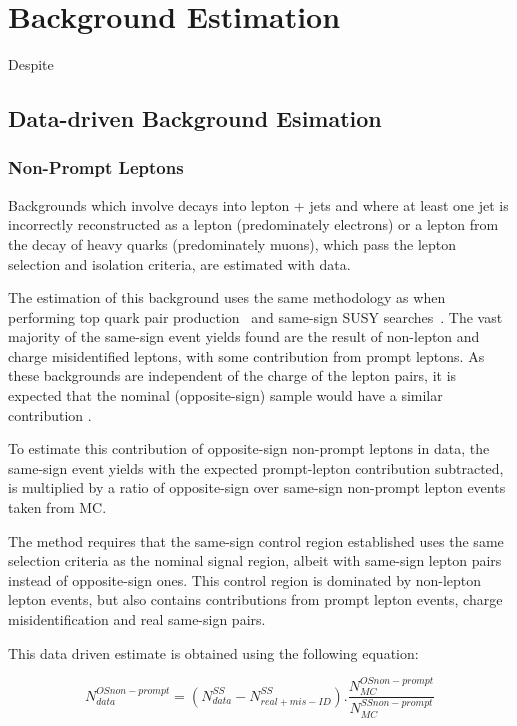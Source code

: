 \chapter{Background Estimation}\label{chapter:bkg}
Despite 

\section{Data-driven Background Esimation}\label{sec:dataDrivenBackground}

\subsection{Non-Prompt Leptons}\label{sec:NPLs}
Backgrounds which involve decays into lepton + jets and where at least one jet is incorrectly reconstructed as a lepton (predominately electrons) or a lepton from the decay of heavy quarks (predominately muons), which pass the lepton selection and isolation criteria, are estimated with data.

The estimation of this background uses the same methodology as when performing top quark pair production~\cite{CMS:2016syx} and same-sign SUSY searches~\cite{CMS:2015vqc}.
The vast majority of the same-sign event yields found are the result of non-lepton and charge misidentified leptons, with some contribution from prompt leptons.
As these backgrounds are independent of the charge of the lepton pairs, it is expected that the nominal (opposite-sign) sample would have a similar contribution \cite{CMS:2015vqc}.

To estimate this contribution of opposite-sign non-prompt leptons in data, the same-sign event yields with the expected prompt-lepton contribution subtracted, is multiplied by a ratio of opposite-sign over same-sign non-prompt lepton events taken from MC.

The method requires that the same-sign control region established uses the same selection criteria as the nominal signal region, albeit with same-sign lepton pairs instead of opposite-sign ones.
This control region is dominated by non-lepton lepton events, but also contains contributions from prompt lepton events, charge misidentification and real same-sign pairs.

This data driven estimate is obtained using the following equation:

\begin{equation}
 N_{data}^{OS non-prompt} = (N_{data}^{SS} - N^{SS}_{real + mis-ID}).\frac{N_{MC}^{OS non-prompt}}{N_{MC}^{SS non-prompt}}
\end{equation}

